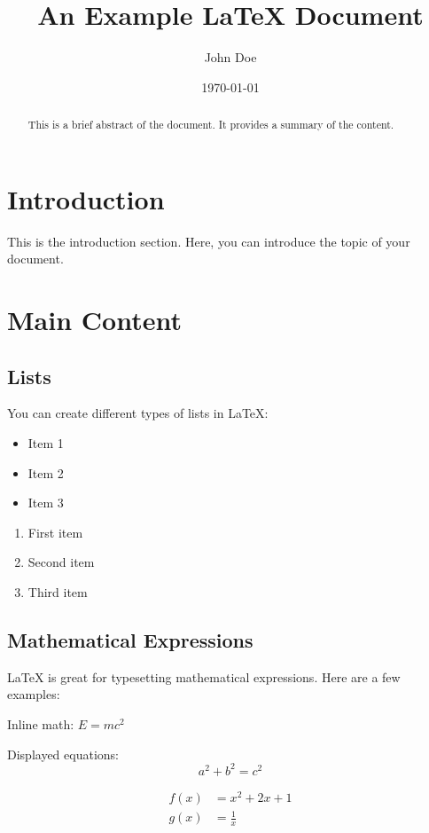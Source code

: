 \documentclass{article}
\title{An Example LaTeX Document}
\author{John Doe}
\date{\today}
\begin{document}
\maketitle

\begin{abstract}
This is a brief abstract of the document. It provides a summary of the content.
\end{abstract}

\section{Introduction}
This is the introduction section. Here, you can introduce the topic of your document.

\section{Main Content}

\subsection{Lists}
You can create different types of lists in LaTeX:

\begin{itemize}
    \item Item 1
    \item Item 2
    \item Item 3
\end{itemize}

\begin{enumerate}
    \item First item
    \item Second item
    \item Third item
\end{enumerate}

\subsection{Mathematical Expressions}
LaTeX is great for typesetting mathematical expressions. Here are a few examples:

Inline math: \( E = mc^2 \)

Displayed equations:
\begin{equation}
    a^2 + b^2 = c^2
\end{equation}

\begin{align}
    f(x) &= x^2 + 2x + 1 \\
    g(x) &= \frac{1}{x}
\end{align}
\end{document}
